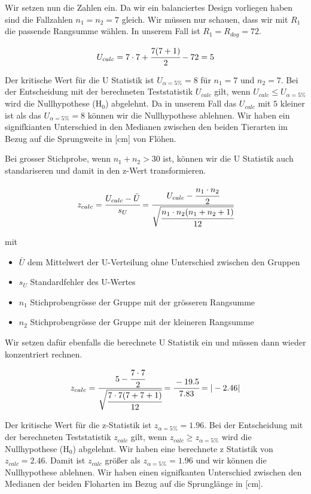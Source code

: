 \documentclass[
  letterpaper,
  DIV=11,
  oneside]{scrreport}
\providecommand{\tightlist}{%
  \setlength{\itemsep}{0pt}\setlength{\parskip}{0pt}}\usepackage{longtable,booktabs,array}
\begin{document}
Wir setzen nun die Zahlen ein. Da wir ein balanciertes Design vorliegen
haben sind die Fallzahlen \(n_1 = n_2 = 7\) gleich. Wir müssen nur
schauen, dass wir mit \(R_1\) die passende Rangsumme wählen. In unserem
Fall ist \(R_1 = R_{dog} = 72\).

\[
U_{calc} = 7 \cdot 7 + \cfrac{7(7+1)}{2}-72 = 5
\]

Der kritische Wert für die U Statistik ist \(U_{\alpha = 5\%} = 8\) für
\(n_1 = 7\) und \(n_2 = 7\). Bei der Entscheidung mit der berechneten
Teststatistik \(U_{calc}\) gilt, wenn \(U_{calc} \leq U_{\alpha = 5\%}\)
wird die Nullhypothese (H\(_0\)) abgelehnt. Da in unserem Fall das
\(U_{calc}\) mit \(5\) kleiner ist als das \(U_{\alpha = 5\%} = 8\)
können wir die Nullhypothese ablehnen. Wir haben ein signifkianten
Unterschied in den Medianen zwischen den beiden Tierarten im Bezug auf
die Sprungweite in {[}cm{]} von Flöhen.

Bei grosser Stichprobe, wenn \(n_1 + n_2 > 30\) ist, können wir die U
Statistik auch standariseren und damit in den z-Wert transformieren.

\[
z_{calc} = \cfrac{U_{calc} - \bar{U}}{s_U} = \cfrac{U_{calc} - \cfrac{n_1 \cdot n_2}{2}}{\sqrt{\cfrac{n_1 \cdot n_2 (n_1 + n_2 +1)}{12}}}
\]

mit

\begin{itemize}
\tightlist
\item
  \(\bar{U}\) dem Mittelwert der U-Verteilung ohne Unterschied zwischen
  den Gruppen
\item
  \(s_U\) Standardfehler des U-Wertes
\item
  \(n_1\) Stichprobengrösse der Gruppe mit der grösseren Rangsumme
\item
  \(n_2\) Stichprobengrösse der Gruppe mit der kleineren Rangsumme
\end{itemize}

Wir setzen dafür ebenfalls die berechnete U Statistik ein und müssen
dann wieder konzentriert rechnen.

\[
z_{calc} = \cfrac{5 - \cfrac{7 \cdot 7}{2}}{\sqrt{\cfrac{7 \cdot 7 (7 + 7 +1)}{12}}} = \cfrac{-19.5}{7.83} = |-2.46|
\]

Der kritische Wert für die z-Statistik ist \(z_{\alpha = 5\%} = 1.96\).
Bei der Entscheidung mit der berechneten Teststatistik \(z_{calc}\)
gilt, wenn \(z_{calc} \geq z_{\alpha = 5\%}\) wird die Nullhypothese
(H\(_0\)) abgelehnt. Wir haben eine berechnete z Statistik von
\(z_{calc} = 2.46\). Damit ist \(z_{calc}\) größer als
\(z_{\alpha = 5\%} = 1.96\) und wir können die Nullhypothese ablehnen.
Wir haben einen signifkanten Unterschied zwischen den Medianen der
beiden Floharten im Bezug auf die Sprunglänge in {[}cm{]}.
\end{document}
